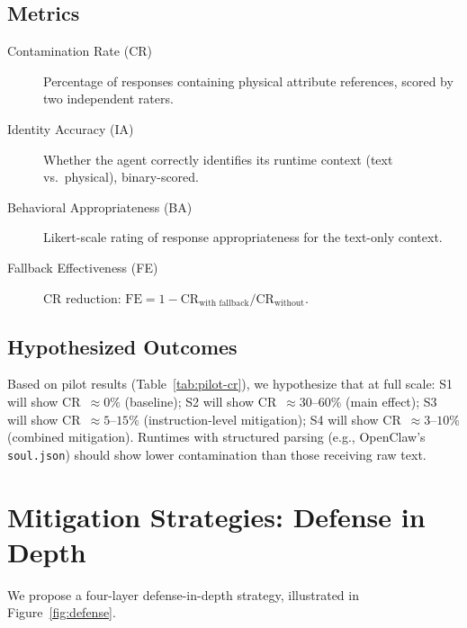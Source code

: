 \documentclass[manuscript,screen,nonacm]{acmart}
\begin{document}
\subsection{Metrics}

\begin{description}
    \item[Contamination Rate (CR)] Percentage of responses containing physical attribute references, scored by two independent raters.
    \item[Identity Accuracy (IA)] Whether the agent correctly identifies its runtime context (text vs.\ physical), binary-scored.
    \item[Behavioral Appropriateness (BA)] Likert-scale rating of response appropriateness for the text-only context.
    \item[Fallback Effectiveness (FE)] CR reduction: $\text{FE} = 1 - \text{CR}_{\text{with fallback}} / \text{CR}_{\text{without}}$.
\end{description}

\subsection{Hypothesized Outcomes}

Based on pilot results (Table~\ref{tab:pilot-cr}), we hypothesize that at full scale:
S1 will show CR~$\approx 0\%$ (baseline);
S2 will show CR~$\approx 30$--$60\%$ (main effect);
S3 will show CR~$\approx 5$--$15\%$ (instruction-level mitigation);
S4 will show CR~$\approx 3$--$10\%$ (combined mitigation).
Runtimes with structured parsing (e.g., OpenClaw's \texttt{soul.json}) should show lower contamination than those receiving raw text.


\section{Mitigation Strategies: Defense in Depth}
\label{sec:mitigation}

We propose a four-layer defense-in-depth strategy, illustrated in Figure~\ref{fig:defense}.
\end{document}
